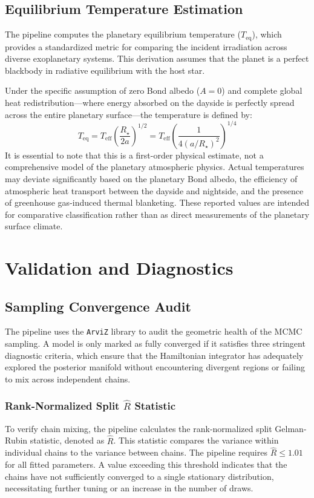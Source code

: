 \documentclass[12pt,a4paper,oneside]{report}
\newcommand{\Rstar}{\ensuremath{R_{\star}}}
\newcommand{\Teff}{\ensuremath{T_{\mathrm{eff}}}}
\newcommand{\code}[1]{\texttt{\small #1}}
\begin{document}
\section{Equilibrium Temperature Estimation}
The pipeline computes the planetary equilibrium temperature ($T_{\mathrm{eq}}$), which provides a standardized metric for comparing the incident irradiation across diverse exoplanetary systems. This derivation assumes that the planet is a perfect blackbody in radiative equilibrium with the host star. 

Under the specific assumption of zero Bond albedo ($A=0$) and complete global heat redistribution—where energy absorbed on the dayside is perfectly spread across the entire planetary surface—the temperature is defined by:
\begin{equation}
  T_{\mathrm{eq}} = \Teff \left( \frac{\Rstar}{2a} \right)^{1/2} = \Teff \left( \frac{1}{4(a/\Rstar)^2} \right)^{1/4}
\end{equation}
It is essential to note that this is a first-order physical estimate, not a comprehensive model of the planetary atmospheric physics. Actual temperatures may deviate significantly based on the planetary Bond albedo, the efficiency of atmospheric heat transport between the dayside and nightside, and the presence of greenhouse gas-induced thermal blanketing. These reported values are intended for comparative classification rather than as direct measurements of the planetary surface climate.

\chapter{Validation and Diagnostics}

\section{Sampling Convergence Audit}
The pipeline uses the \code{ArviZ} library to audit the geometric health of the MCMC sampling. A model is only marked as fully converged if it satisfies three stringent diagnostic criteria, which ensure that the Hamiltonian integrator has adequately explored the posterior manifold without encountering divergent regions or failing to mix across independent chains.

\subsection{Rank-Normalized Split \(\hat{R}\) Statistic}
To verify chain mixing, the pipeline calculates the rank-normalized split Gelman-Rubin statistic, denoted as \(\hat{R}\). This statistic compares the variance within individual chains to the variance between chains. The pipeline requires \(\hat{R} \leq 1.01\) for all fitted parameters. A value exceeding this threshold indicates that the chains have not sufficiently converged to a single stationary distribution, necessitating further tuning or an increase in the number of draws.
\end{document}

